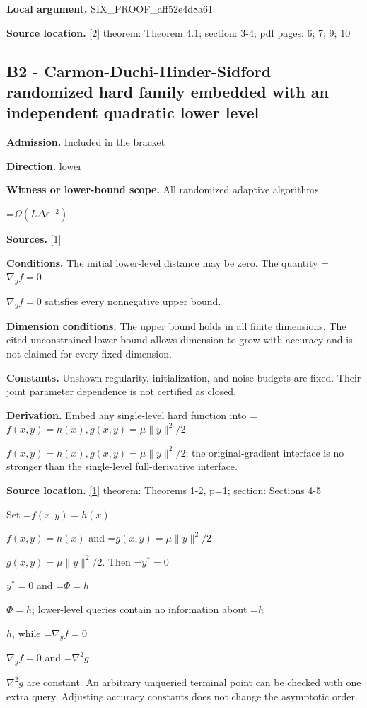 \documentclass[10pt,a4paper]{article}
\newcommand{\AtlasMath}[1]{\par\begingroup\centering\setbox0=\hbox{$\displaystyle #1$}\ifdim\wd0>1.4\linewidth\typeout{ATLAS WIDE FORMULA: \the\wd0}\fi\ifdim\wd0>\linewidth\resizebox{\linewidth}{!}{\box0}\else\box0\fi\par\endgroup}
\newcommand{\AtlasInlineMath}[1]{\begingroup\setbox0=\hbox{$#1$}\ifdim\wd0>.4\linewidth\endgroup\AtlasMath{#1}\else\endgroup$#1$\fi}
\begin{document}
\textbf{Local argument.} SIX\_PROOF\_aff52e4d8a61



\textbf{Source location.} \href{https://jmlr.org/papers/volume26/23-1104/23-1104.pdf}{[2]} theorem: Theorem 4.1; section: 3-4; pdf pages: 6; 7; 9; 10



\subsection{B2 - Carmon-Duchi-Hinder-Sidford randomized hard family embedded with an independent quadratic lower level}


\textbf{Admission.} Included in the bracket



\textbf{Direction.} lower



\textbf{Witness or lower-bound scope.} All randomized adaptive algorithms



\AtlasMath{\Omega(L\Delta\varepsilon^{-2})}


\textbf{Sources.} \href{https://arxiv.org/abs/1710.11606}{[1]}



\textbf{Conditions.} The initial lower-level distance may be zero. The quantity \AtlasInlineMath{\nabla_yf=0} satisfies every nonnegative upper bound.



\textbf{Dimension conditions.} The upper bound holds in all finite dimensions. The cited unconstrained lower bound allows dimension to grow with accuracy and is not claimed for every fixed dimension.



\textbf{Constants.} Unshown regularity, initialization, and noise budgets are fixed. Their joint parameter dependence is not certified as closed.



\textbf{Derivation.} Embed any single-level hard function into \AtlasInlineMath{f(x,y)=h(x),g(x,y)=\mu\|y\|^2/2}; the original-gradient interface is no stronger than the single-level full-derivative interface.



\textbf{Source location.} \href{https://arxiv.org/abs/1710.11606}{[1]} theorem: Theorems 1-2, p=1; section: Sections 4-5



Set \AtlasInlineMath{f(x,y)=h(x)} and \AtlasInlineMath{g(x,y)=\mu\|y\|^2/2}. Then \AtlasInlineMath{y^*=0} and \AtlasInlineMath{\Phi=h}; lower-level queries contain no information about \AtlasInlineMath{h}, while \AtlasInlineMath{\nabla_yf=0} and \AtlasInlineMath{\nabla^2g} are constant. An arbitrary unqueried terminal point can be checked with one extra query. Adjusting accuracy constants does not change the asymptotic order.
\end{document}
